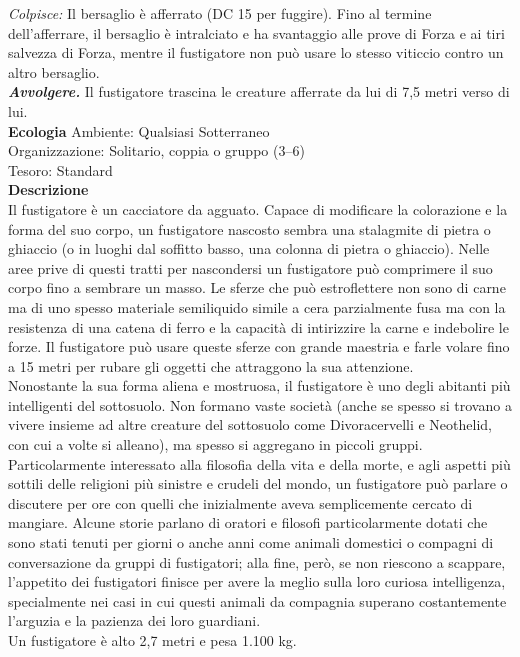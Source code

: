 \begin{multicols}{2}
\emph{Colpisce:} Il bersaglio è afferrato (DC 15 per fuggire). Fino al termine dell'afferrare, il bersaglio è intralciato e ha svantaggio alle prove di Forza e ai tiri salvezza di Forza, mentre il fustigatore non può usare lo stesso viticcio contro un altro bersaglio.\\
\emph{\textbf{Avvolgere.}} Il fustigatore trascina le creature afferrate da lui di 7,5 metri verso di lui.\\
\textbf{Ecologia}
Ambiente: Qualsiasi Sotterraneo\\
Organizzazione: Solitario, coppia o gruppo (3–6)\\
Tesoro: Standard\\
\textbf{Descrizione}\\
Il fustigatore è un cacciatore da agguato. Capace di modificare la colorazione e la forma del suo corpo, un fustigatore nascosto sembra una stalagmite di pietra o ghiaccio (o in luoghi dal soffitto basso, una colonna di pietra o ghiaccio). Nelle aree prive di questi tratti per nascondersi un fustigatore può comprimere il suo corpo fino a sembrare un masso. Le sferze che può estroflettere non sono di carne ma di uno spesso materiale semiliquido simile a cera parzialmente fusa ma con la resistenza di una catena di ferro e la capacità di intirizzire la carne e indebolire le forze. Il fustigatore può usare queste sferze con grande maestria e farle volare fino a 15 metri per rubare gli oggetti che attraggono la sua attenzione.\\

Nonostante la sua forma aliena e mostruosa, il fustigatore è uno degli abitanti più intelligenti del sottosuolo. Non formano vaste società (anche se spesso si trovano a vivere insieme ad altre creature del sottosuolo come Divoracervelli e Neothelid, con cui a volte si alleano), ma spesso si aggregano in piccoli gruppi. Particolarmente interessato alla filosofia della vita e della morte, e agli aspetti più sottili delle religioni più sinistre e crudeli del mondo, un fustigatore può parlare o discutere per ore con quelli che inizialmente aveva semplicemente cercato di mangiare. Alcune storie parlano di oratori e filosofi particolarmente dotati che sono stati tenuti per giorni o anche anni come animali domestici o compagni di conversazione da gruppi di fustigatori; alla fine, però, se non riescono a scappare, l’appetito dei fustigatori finisce per avere la meglio sulla loro curiosa intelligenza, specialmente nei casi in cui questi animali da compagnia superano costantemente l’arguzia e la pazienza dei loro guardiani.\\
Un fustigatore è alto 2,7 metri e pesa 1.100 kg.\\


\end{multicols}
